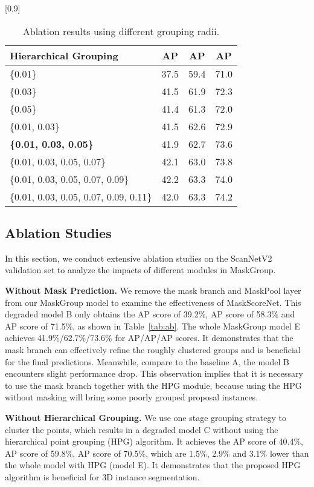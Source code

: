 \documentclass{article}
\begin{document}
\begin{table}[t]
	\small
	\centering
	\caption{Ablation results using different grouping radii.}
	\scalebox{0.9}[0.9]{
		\begin{tabular}{l|c|c|c}
			\toprule
			Hierarchical Grouping  & AP  & AP  & AP  \\
			\midrule
			\{0.01\}  &37.5 &59.4 &71.0 \\
			\{0.03\}  &41.5 &61.9 &72.3 \\
			\{0.05\}  &41.4 &61.3 &72.0 \\
			\midrule
			\{0.01, 0.03\}  &41.5 &62.6 &72.9 \\
			\bf \{0.01, 0.03, 0.05\}  & 41.9 & 62.7 &  73.6 \\
			\{0.01, 0.03, 0.05, 0.07\} &42.1  &63.0   &73.8 \\
			\{0.01, 0.03, 0.05, 0.07, 0.09\} &42.2 &63.3  &74.0 \\
			\{0.01, 0.03, 0.05, 0.07, 0.09, 0.11\} &42.0  &63.3  &74.2 \\
			\bottomrule
		\end{tabular}
	}
	\label{tab:ab_hgp}
	\vspace{-4mm}
\end{table}

\subsection{Ablation Studies}
\label{sec_exp}

In this section, we conduct extensive ablation studies on the ScanNetV2 validation set to analyze the impacts of different modules in MaskGroup. 

\noindent\textbf{Without Mask Prediction.}
We remove the mask branch and  MaskPool layer from our MaskGroup model to examine the effectiveness of MaskScoreNet.
This degraded model B only obtains the AP score of 39.2\%,  AP score of 58.3\% and  AP score of 71.5\%, as shown in Table~\ref{tab:ab}. 
The whole MaskGroup model E achieves 41.9\%/62.7\%/73.6\% for AP/AP/AP scores. It demonstrates that the mask branch can effectively refine the roughly clustered groups and is beneficial for the final predictions.
Meanwhile, compare to the baseline A, the model B encounters slight performance drop. This observation implies that it is necessary to use the mask branch together with the HPG module, because using the HPG without masking will bring some poorly grouped proposal instances.


\noindent\textbf{Without Hierarchical Grouping.}
We use one stage grouping strategy to cluster the points, which results in a degraded model C without using the hierarchical point grouping (HPG) algorithm. 
It achieves the AP score of 40.4\%,  AP score of 59.8\%,  AP score of 70.5\%, which are 1.5\%, 2.9\% and 3.1\% lower than the whole model with HPG (model E). It demonstrates that the proposed HPG algorithm is beneficial for 3D instance segmentation.
\end{document}
